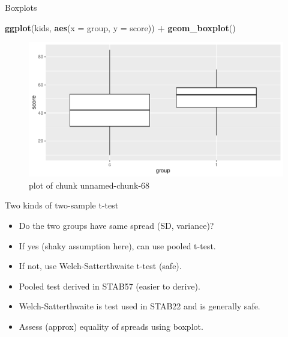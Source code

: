 \documentclass[ignorenonframetext,]{beamer}
\newenvironment{Shaded}{\begin{snugshade}}{\end{snugshade}}
\newcommand{\DataTypeTok}[1]{\textcolor[rgb]{0.13,0.29,0.53}{#1}}
\newcommand{\KeywordTok}[1]{\textcolor[rgb]{0.13,0.29,0.53}{\textbf{#1}}}
\newcommand{\NormalTok}[1]{#1}
\newcommand{\OperatorTok}[1]{\textcolor[rgb]{0.81,0.36,0.00}{\textbf{#1}}}
\newcommand{\StringTok}[1]{\textcolor[rgb]{0.31,0.60,0.02}{#1}}
\providecommand{\tightlist}{%
  \setlength{\itemsep}{0pt}\setlength{\parskip}{0pt}}
\begin{document}
\begin{frame}[fragile]{Boxplots}
\protect\hypertarget{boxplots}{}

\begin{Shaded}
\begin{Highlighting}[]
\KeywordTok{ggplot}\NormalTok{(kids, }\KeywordTok{aes}\NormalTok{(}\DataTypeTok{x =}\NormalTok{ group, }\DataTypeTok{y =}\NormalTok{ score)) }\OperatorTok{+}\StringTok{ }\KeywordTok{geom_boxplot}\NormalTok{()}
\end{Highlighting}
\end{Shaded}

\begin{figure}
\centering
\includegraphics{figure/unnamed-chunk-68-1.pdf}
\caption{plot of chunk unnamed-chunk-68}
\end{figure}

\end{frame}

\begin{frame}{Two kinds of two-sample t-test}
\protect\hypertarget{two-kinds-of-two-sample-t-test}{}

\begin{itemize}
\tightlist
\item
  Do the two groups have same spread (SD, variance)?
\item
  If yes (shaky assumption here), can use pooled t-test.
\item
  If not, use Welch-Satterthwaite t-test (safe).
\item
  Pooled test derived in STAB57 (easier to derive).
\item
  Welch-Satterthwaite is test used in STAB22 and is generally safe.
\item
  Assess (approx) equality of spreads using boxplot.
\end{itemize}

\end{frame}
\end{document}
